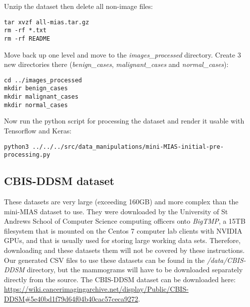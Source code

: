 Unzip the dataset then delete all non-image files:

\begin{lstlisting}
tar xvzf all-mias.tar.gz
rm -rf *.txt 
rm -rf README 
\end{lstlisting}

Move back up one level and move to the \textit{images\_processed} directory. Create 3 new directories there (\textit{benign\_cases}, \textit{malignant\_cases} and \textit{normal\_cases}):

\begin{lstlisting}
cd ../images_processed
mkdir benign_cases
mkdir malignant_cases
mkdir normal_cases
\end{lstlisting}

Now run the python script for processing the dataset and render it usable with Tensorflow and Keras:

\begin{lstlisting}
python3 ../../../src/data_manipulations/mini-MIAS-initial-pre-processing.py
\end{lstlisting}

\subsection{CBIS-DDSM dataset}

These datasets are very large (exceeding 160GB) and more complex than the mini-MIAS dataset to use. They were downloaded by the University of St Andrews School of Computer Science computing officers onto \textit{BigTMP}, a 15TB filesystem that is mounted on the Centos 7 computer lab clients with NVIDIA GPUs, and that is usually used for storing large working data sets. Therefore, downloading and these datasets them will not be covered by these instructions.\\

Our generated CSV files to use these datasets can be found in the \textit{/data/CBIS-DDSM} directory, but the mammograms will have to be downloaded separately directly from the source. The CBIS-DDSM dataset can be downloaded here: \url{https://wiki.cancerimagingarchive.net/display/Public/CBIS-DDSM#5e40bd1f79d64f04b40cac57ceca9272}.
